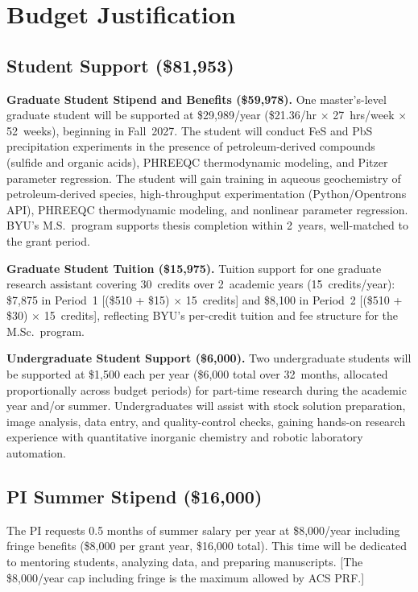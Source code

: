 \documentclass[12pt]{article}
\begin{document}
\section*{Budget Justification}

\doublespacing

\subsection*{Student Support (\$81,953)}

\textbf{Graduate Student Stipend and Benefits (\$59,978).}
One master's-level graduate student will be supported at \$29,989/year (\$21.36/hr $\times$ 27~hrs/week $\times$ 52~weeks), beginning in Fall~2027. The student will conduct FeS and PbS precipitation experiments in the presence of petroleum-derived compounds (sulfide and organic acids), PHREEQC thermodynamic modeling, and Pitzer parameter regression. The student will gain training in aqueous geochemistry of petroleum-derived species, high-throughput experimentation (Python/Opentrons API), PHREEQC thermodynamic modeling, and nonlinear parameter regression. BYU's M.S.\ program supports thesis completion within 2~years, well-matched to the grant period.

\textbf{Graduate Student Tuition (\$15,975).}
Tuition support for one graduate research assistant covering 30~credits over 2~academic years (15~credits/year): \$7,875 in Period~1 [(\$510 + \$15) $\times$ 15~credits] and \$8,100 in Period~2 [(\$510 + \$30) $\times$ 15~credits], reflecting BYU's per-credit tuition and fee structure for the M.Sc.\ program.

\textbf{Undergraduate Student Support (\$6,000).}
Two undergraduate students will be supported at \$1,500 each per year (\$6,000 total over 32~months, allocated proportionally across budget periods) for part-time research during the academic year and/or summer. Undergraduates will assist with stock solution preparation, image analysis, data entry, and quality-control checks, gaining hands-on research experience with quantitative inorganic chemistry and robotic laboratory automation.

\subsection*{PI Summer Stipend (\$16,000)}

The PI requests 0.5 months of summer salary per year at \$8,000/year including fringe benefits (\$8,000 per grant year, \$16,000 total). This time will be dedicated to mentoring students, analyzing data, and preparing manuscripts. [The \$8,000/year cap including fringe is the maximum allowed by ACS PRF.]
\end{document}
